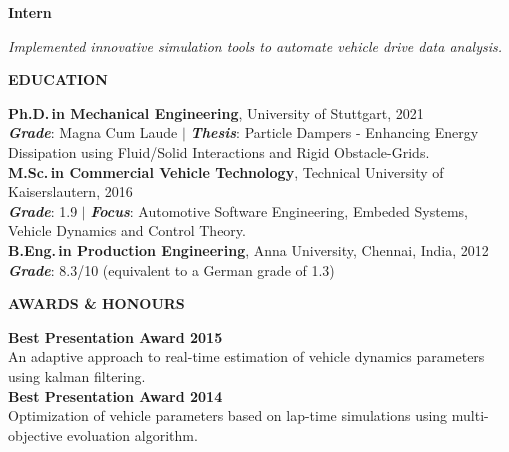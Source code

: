 \documentclass[a4paper,10pt]{article}
\begin{document}
\noindent
\colorbox{gray!40}{%
    \parbox{0.99\textwidth}{%
        \textcolor{highlightcolor}{\textbf{Intern}}
    }%
}

\vspace{0.2cm}
\noindent
\textit{Implemented innovative simulation tools to automate vehicle drive data analysis.}

\newpage

\noindent{\rule{\linewidth}{1.4pt}}
\noindent \textbf{EDUCATION}

\vspace{-0.1cm}
\noindent{\rule{\linewidth}{0.01cm}}

\noindent \textbf{Ph.D.\,in Mechanical Engineering}, University of Stuttgart, 2021\\
\noindent \textcolor{highlightcolor}{\textbf{\textit{Grade}}}: Magna Cum Laude $\vert$ \textcolor{highlightcolor}{\textbf{\textit{Thesis}}}: {Particle Dampers - Enhancing Energy Dissipation using Fluid/Solid Interactions and Rigid Obstacle-Grids.}\\

\noindent \textbf{M.Sc.\,in Commercial Vehicle Technology}, Technical University of Kaiserslautern, 2016\\
\noindent \textcolor{highlightcolor}{\textbf{\textit{Grade}}}: 1.9 $\vert$ \textcolor{highlightcolor}{\textbf{\textit{Focus}}}:  Automotive Software Engineering, Embeded Systems, Vehicle Dynamics and Control Theory.\\

\noindent \textbf{B.Eng.\,in Production Engineering}, Anna University, Chennai, India, 2012\\
\noindent \textcolor{highlightcolor}{\textbf{\textit{Grade}}}: 8.3/10 (equivalent to a German grade of 1.3)

\noindent{\rule{\linewidth}{1.4pt}}
\textbf{AWARDS \& HONOURS}

\vspace{-0.1cm}
\noindent{\rule{\linewidth}{0.01cm}}

\vspace{0.1cm}
\noindent \textbf{Best Presentation Award 2015}\\
An adaptive approach to real-time estimation of vehicle dynamics parameters using kalman filtering.\\

\noindent \textbf{Best Presentation Award 2014}\\
Optimization of vehicle parameters based on lap-time simulations using multi-objective evoluation algorithm.
\end{document}
